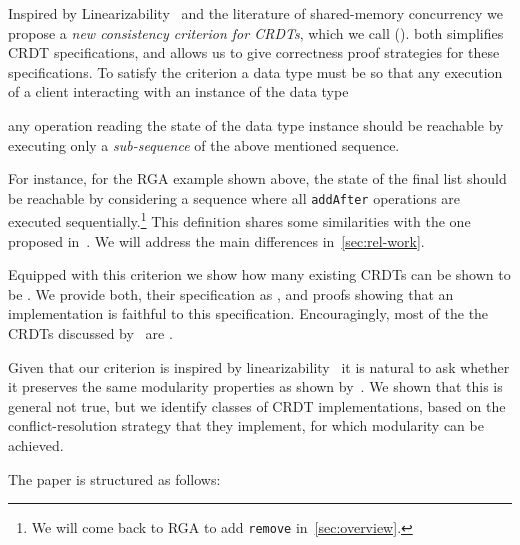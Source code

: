Inspired by Linearizability~\cite{HerlihyW90} and the literature of
shared-memory concurrency we propose a \emph{new consistency criterion
  for CRDTs}, which we call \emph{\CRDTLin{}} (\CRDTLinshort{}).
%
\CRDTLinshort{} both simplifies CRDT specifications, and allows us to
give correctness proof strategies for these specifications.
%
To satisfy the \CRDTLinshort{} criterion a data type must be so that
any execution of a client interacting with an instance of the data
type
\begin{inparaenum}
\item {}
\item any operation reading the state of the data type instance should
  be reachable by executing only a \emph{sub-sequence} of the above
  mentioned sequence.
\end{inparaenum}
For instance, for the RGA example shown above, the state of the final
list should be reachable by considering a sequence where all
\lstinline|addAfter| operations are executed sequentially.\footnote{We
  will come back to RGA to add \lstinline|remove|
  in~\autoref{sec:overview}.}
%
This definition shares some similarities with the one proposed
in~\cite{PerrinMJ14}. We will address the main differences
in~\autoref{sec:rel-work}.

Equipped with this criterion we show how many existing CRDTs can be
shown to be \crdtlinearizable{}.
%
We provide both, their specification as \CRDTLinshort{}, and proofs
showing that an implementation is faithful to this specification.
%
Encouragingly, most of the the CRDTs discussed by~\citet{ShapiroPBZ11}
are \CRDTLinshort{}.

Given that our criterion is inspired by
linearizability~\cite{HerlihyW90} it is natural to ask whether it
preserves the same modularity properties as shown
by~\citet{HerlihyW90}.
%
We shown that this is general not true, but we identify classes of
CRDT implementations, based on the conflict-resolution strategy that
they implement, for which modularity can be achieved.


The paper is structured as follows:
\begin{inparaitem}
\item {}
\end{inparaitem}


